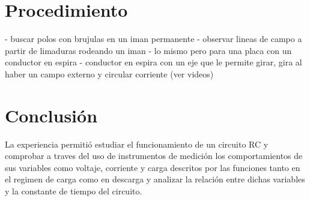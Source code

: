 \documentclass[11pt, letterpaper]{article}
\begin{document}
\pagebreak

\section{Procedimiento}
- buscar polos con brujulas en un iman permanente
- observar lineas de campo a partir de limaduras rodeando un iman
- lo mismo pero para una placa con un conductor en espira
- conductor en espira con un eje que le permite girar, gira al 
haber un campo externo y circular corriente (ver videos)

\pagebreak
\section{Conclusión}
La experiencia permitió estudiar el funcionamiento de un circuito
RC y comprobar a traves del uso de instrumentos de medición los
comportamientos de sus variables como voltaje, corriente y carga
descritos por las funciones tanto en el regimen de carga como en
descarga y analizar la relación entre dichas variables y la 
constante de tiempo del circuito.
\end{document}
